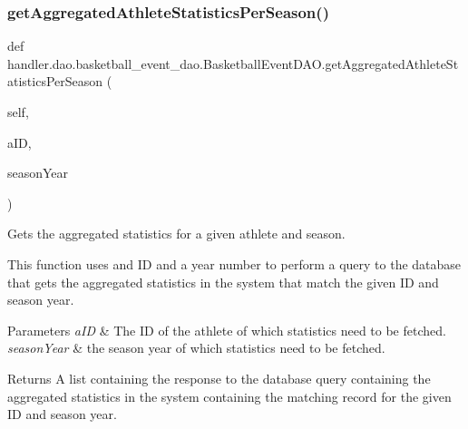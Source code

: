 \subsubsection{\texorpdfstring{get\+Aggregated\+Athlete\+Statistics\+Per\+Season()}{getAggregatedAthleteStatisticsPerSeason()}}
{\footnotesize\ttfamily def handler.\+dao.\+basketball\+\_\+event\+\_\+dao.\+Basketball\+Event\+D\+A\+O.\+get\+Aggregated\+Athlete\+Statistics\+Per\+Season (\begin{DoxyParamCaption}\item[{}]{self,  }\item[{}]{a\+ID,  }\item[{}]{season\+Year }\end{DoxyParamCaption})}



Gets the aggregated statistics for a given athlete and season. 

This function uses and ID and a year number to perform a query to the database that gets the aggregated statistics in the system that match the given ID and season year.


\begin{DoxyParams}{Parameters}
{\em a\+ID} & The ID of the athlete of which statistics need to be fetched. \\
\hline
{\em season\+Year} & the season year of which statistics need to be fetched.\\
\hline
\end{DoxyParams}
\begin{DoxyReturn}{Returns}
A list containing the response to the database query containing the aggregated statistics in the system containing the matching record for the given ID and season year. 
\end{DoxyReturn}
\mbox{\label{classhandler_1_1dao_1_1basketball__event__dao_1_1_basketball_event_d_a_o_afc64d2c7c96fc004730856339137eec7}} 
